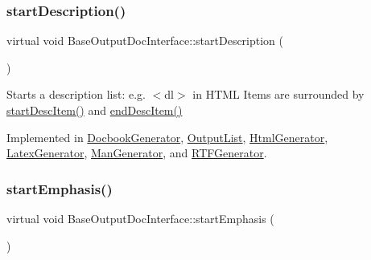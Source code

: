 \mbox{\label{class_base_output_doc_interface_ac9c801c3ad0b50e3e69be184b50c2fef}} 
\subsubsection{\texorpdfstring{startDescription()}{startDescription()}}
{\footnotesize\ttfamily virtual void Base\+Output\+Doc\+Interface\+::start\+Description (\begin{DoxyParamCaption}{ }\end{DoxyParamCaption})\hspace{0.3cm}{\ttfamily [pure virtual]}}

Starts a description list\+: e.\+g. {\ttfamily $<$dl$>$} in H\+T\+ML Items are surrounded by \mbox{\hyperlink{class_base_output_doc_interface_a5d1cc59d94c3f529c90e0a06704be181}{start\+Desc\+Item()}} and \mbox{\hyperlink{class_base_output_doc_interface_a09e3aa9d3faac55b2cc9290eaa69f55b}{end\+Desc\+Item()}} 

Implemented in \mbox{\hyperlink{class_docbook_generator_abca64d577a05a2d49a99edfef8e72e72}{Docbook\+Generator}}, \mbox{\hyperlink{class_output_list_a63dfb00b7d99d58acfb89473ab8ac7d8}{Output\+List}}, \mbox{\hyperlink{class_html_generator_a8ae03ee5e64d705aeebbe605d3c05b0f}{Html\+Generator}}, \mbox{\hyperlink{class_latex_generator_a32a518fb74711bc0e791c03e95c666cb}{Latex\+Generator}}, \mbox{\hyperlink{class_man_generator_a40c97f2dcd8827c13a9d1eedb96701b5}{Man\+Generator}}, and \mbox{\hyperlink{class_r_t_f_generator_a9c6c7896f2bd09fb5e6ce53b9e6cee5c}{R\+T\+F\+Generator}}.

\mbox{\label{class_base_output_doc_interface_a21debc3a6c4c58791a41e715dc78f4ab}} 
\subsubsection{\texorpdfstring{startEmphasis()}{startEmphasis()}}
{\footnotesize\ttfamily virtual void Base\+Output\+Doc\+Interface\+::start\+Emphasis (\begin{DoxyParamCaption}{ }\end{DoxyParamCaption})\hspace{0.3cm}{\ttfamily [pure virtual]}}

